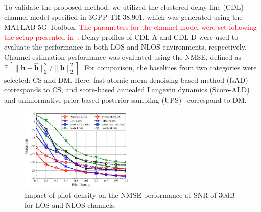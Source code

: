 \documentclass[lettersize,journal]{IEEEtran}
\newcommand{\tred}{\textcolor{red}}
\begin{document}
To validate the proposed method, we utilized the clustered delay line (CDL) channel model specified in 3GPP TR 38.901, which was generated using the MATLAB 5G Toolbox. \tred{The parameters for the channel model were set following the setup presented in~\cite{arvinteMIMOChannelEstimation2023}.} Delay profiles of CDL-A and CDL-D were used to evaluate the performance in both LOS and NLOS environments, respectively. Channel estimation performance was evaluated using the NMSE, defined as $\mathbb{E}[\|\mathbf{h}-\hat{\mathbf{h}}\|_{2}^{2} / \|\mathbf{h}\|_{2}^{2}]$. For comparison, the baselines from two categories were selected: CS and DM. Here, fast atomic norm denoising-based method (fsAD)~\cite{zhangAtomicNormDenoisingBased2018} corresponds to CS, and score-based annealed Langevin dynamics (Score-ALD)~\cite{arvinteMIMOChannelEstimation2023} and uninformative prior-based posterior sampling (UPS)~\cite{zhouGenerativeDiffusionModels2025} correspond to DM.


\begin{figure}[!t]
\includegraphics[width=0.48\textwidth]{images/20251014/fig_1.eps}
\caption{Impact of pilot density on the NMSE performance at SNR of 30dB for LOS and NLOS channels.}
\label{fig_sim_1}
\end{figure}
\end{document}
